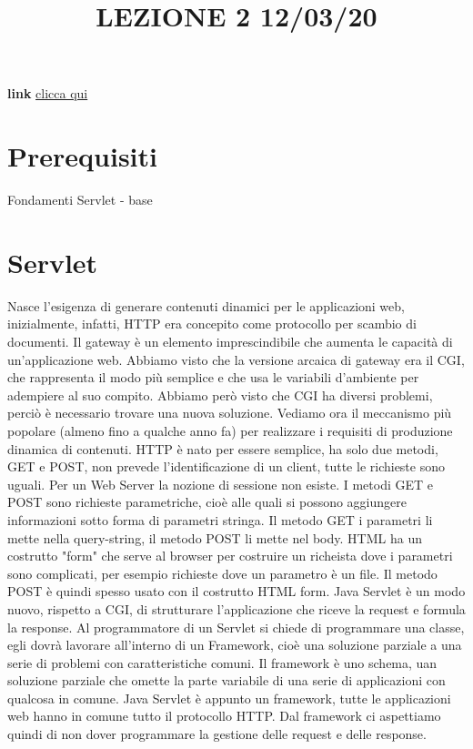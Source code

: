 \title{LEZIONE 2 12/03/20}\newline
\textbf{link} \href{https://web.microsoftstream.com/video/58568b1d-5fc5-41c0-88f6-608e4b8f9f7a}{clicca qui}
\section*{Prerequisiti}
Fondamenti Servlet - base
\section{Servlet}
Nasce l'esigenza di generare contenuti dinamici per le applicazioni web, inizialmente, infatti, HTTP era concepito come protocollo per scambio di documenti.\newline
Il gateway è un elemento imprescindibile che aumenta le capacità di un'applicazione web. Abbiamo visto che la versione arcaica di gateway era il CGI, che rappresenta il modo più semplice e che usa le variabili d'ambiente per adempiere al suo compito. Abbiamo però visto che CGI ha diversi problemi, perciò è necessario trovare una nuova soluzione.\newline
Vediamo ora il meccanismo più popolare (almeno fino a qualche anno fa) per realizzare i requisiti di produzione dinamica di contenuti. HTTP è nato per essere semplice, ha solo due metodi, GET e POST, non prevede l'identificazione di un client, tutte le richieste sono uguali. Per un Web Server la nozione di sessione non esiste. I metodi GET e POST sono richieste parametriche, cioè alle quali si possono aggiungere informazioni sotto forma di parametri stringa. Il metodo GET i parametri li mette nella query-string, il metodo POST li mette nel body. HTML ha un costrutto "form" che serve al browser per costruire un richeista dove i parametri sono complicati, per esempio richieste dove un parametro è un file. Il metodo POST è quindi spesso usato con il costrutto HTML form.\newline
Java Servlet è un modo nuovo, rispetto a CGI, di strutturare l'applicazione che riceve la request e formula la response.\newline
Al programmatore di un Servlet si chiede di programmare una classe, egli dovrà lavorare all'interno di un Framework, cioè una soluzione parziale a una serie di problemi con caratteristiche comuni. Il framework è uno schema, uan soluzione parziale che omette la parte variabile di una serie di applicazioni con qualcosa in comune. Java Servlet è appunto un framework, tutte le applicazioni web hanno in comune tutto il protocollo HTTP. Dal framework ci aspettiamo quindi di non dover programmare la gestione delle request e delle response.\newline
